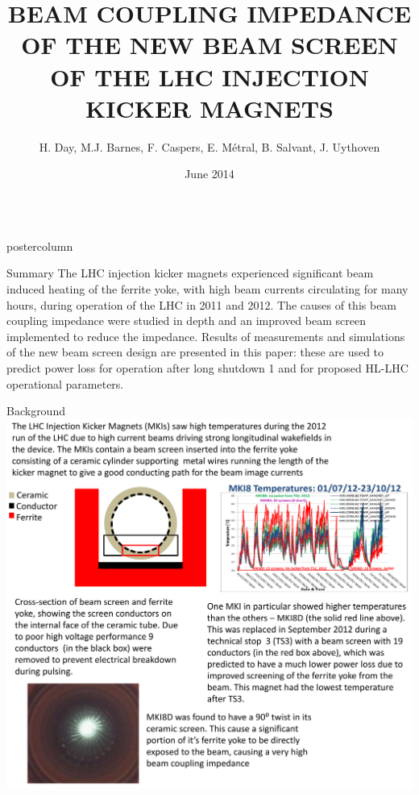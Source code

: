 \documentclass[final,hyperref={pdfpagelabels=false}]{beamer}
\title{BEAM COUPLING IMPEDANCE OF THE NEW BEAM SCREEN OF THE LHC INJECTION KICKER MAGNETS}
\author{H. Day, M.J. Barnes, F. Caspers, E. Métral, B. Salvant, J. Uythoven}
\institute[CERN]{CERN, Geneva, Switzerland}
\date[June 2014]{June 2014}
\newlength{\columnheight}
\begin{document}
\begin{frame}
  \begin{columns}
    \begin{column}{.49\textwidth}
      \begin{beamercolorbox}[center,wd=\textwidth]{postercolumn}
        \begin{minipage}[T]{.95\textwidth}  %
          \parbox[t][\columnheight]{\textwidth}{ %
            \begin{block}{Summary}
\small{
The LHC injection kicker magnets experienced significant beam induced heating of the ferrite yoke, with high beam currents circulating for many hours, during operation of the LHC in 2011 and 2012. The causes of this beam coupling impedance were studied in depth and an improved beam screen implemented to reduce the impedance. Results of measurements and simulations of the new beam screen design are presented in this paper: these are used to predict power loss for operation after long shutdown 1 and for proposed HL-LHC operational parameters.
}
\end{block}
            \vfill
	\begin{block}{Background}
\includegraphics[width=1.0\textwidth]{introductionPicture.pdf}

\end{block}}
\end{minipage}
\end{beamercolorbox}
\end{column}
\end{columns}
\end{frame}
\end{document}
